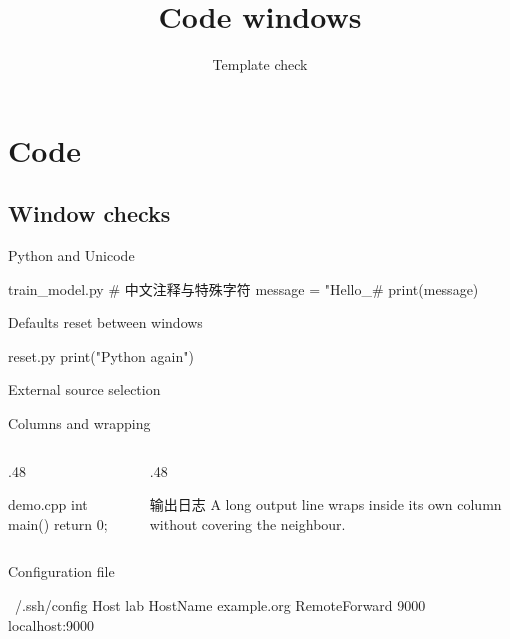 \documentclass[language=english,cjk=true]{campusbeamer}
\title{Code windows}
\author{Template check}
\begin{document}
\section{Code}
\subsection{Window checks}
\begin{frame}[fragile]{Python and Unicode}
\begin{campuscode}[language=Python,numbers,firstnumber=10,caption={保留缩进并显示中文注释。}]{train_model.py}
# 中文注释与特殊字符
message = "Hello_#%
print(message)
\end{campuscode}
\end{frame}
\begin{frame}[fragile]{Defaults reset between windows}
\begin{campuscode}{reset.py}
print("Python again")
\end{campuscode}
\end{frame}
\begin{frame}{External source selection}
\end{frame}
\begin{frame}[fragile]{Columns and wrapping}
\begin{columns}[T,onlytextwidth]
\begin{column}{.48\textwidth}
\begin{campuscode}[language=C++,caption={}]{demo.cpp}
int main() {
    return 0;
}
\end{campuscode}
\end{column}
\begin{column}{.48\textwidth}
\begin{campuscode}[language=text,label=Output,caption={输出不会覆盖相邻列。}]{输出日志}
A long output line wraps inside its own column without covering the neighbour.
\end{campuscode}
\end{column}
\end{columns}
\end{frame}
\begin{frame}[fragile]{Configuration file}
\begin{campuscode}[language=text,icon=\faFileCode,label={Config},description={SSH 配置示例。}]{~/.ssh/config}
Host lab
    HostName example.org
    RemoteForward 9000 localhost:9000
\end{campuscode}
\end{frame}
\end{document}
